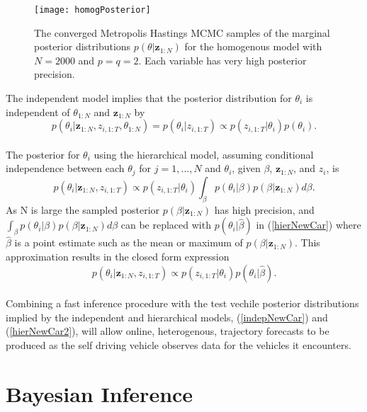 \documentclass[12pt,a4paper]{article}\usepackage[]{graphicx}\usepackage[]{color}
\begin{document}
\begin{figure}
\centering
\texttt{[image: homogPosterior]}
\caption{The converged Metropolis Hastings MCMC samples of the marginal posterior distributions $p(\theta | \textbf{z}_{1:N})$ for the homogenous model with $N = 2000$ and $p = q = 2$. Each variable has very high posterior precision.}
\label{fig:homogPosterior}
\end{figure}

The independent model implies that the posterior distribution for $\theta_i$ is independent of $\theta_{1:N}$ and $\textbf{z}_{1:N}$ by
\begin{equation}
p(\theta_{i}| \textbf{z}_{1:N}, z_{i,1:T}, \theta_{1:N}) = p(\theta_{i} | z_{i, 1:T}) \propto p(z_{i, 1:T} | \theta_i) p(\theta_i).
\label{indepNewCar}
\end{equation}
\\

The posterior for $\theta_i$ using the hierarchical model, assuming conditional independence between each $\theta_j$ for $j = 1, \dots, N$ and $\theta_i$, given $\beta$, $\textbf{z}_{1:N}$, and $z_i$, is
\begin{equation}
\label{hierNewCar}
p(\theta_{i} | \textbf{z}_{1:N}, z_{i, 1:T}) \propto p(z_{i, 1:T} | \theta_{i}) \int_{\beta} p(\theta_{i} | \beta) p (\beta | \textbf{z}_{1:N}) d\beta.
\end{equation}
As N is large the sampled posterior $p(\beta | \textbf{z}_{1:N})$ has high precision, and $\int_{\beta} p(\theta_{i} | \beta) p (\beta | \textbf{z}_{1:N}) d\beta$ can be replaced with $p(\theta_{i} | \hat{\beta})$ in (\ref{hierNewCar}) where $\hat{\beta}$ is a point estimate such as the mean or maximum of $p(\beta | \textbf{z}_{1:N})$. This approximation results in the closed form expression
\begin{equation}
\label{hierNewCar2}
p(\theta_{i} | \textbf{z}_{1:N}, z_{i, 1:T}) \propto p(z_{i, 1:T} | \theta_{i}) p(\theta_{i} | \hat{\beta}).
\end{equation}
\\

Combining a fast inference procedure with the test vechile posterior distributions implied by the independent and hierarchical models, (\ref{indepNewCar}) and (\ref{hierNewCar2}), will allow online, heterogenous, trajectory forecasts to be produced as the self driving vehicle observes data for the vehicles it encounters.

\section{Bayesian Inference}
\label{sec:Inference}
\end{document}
